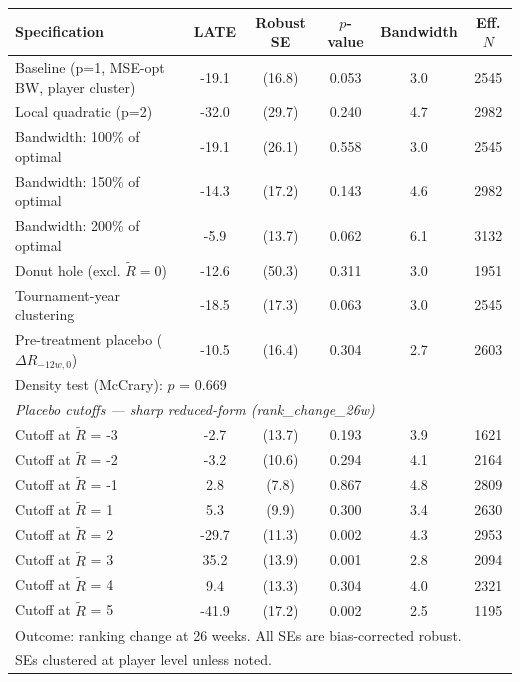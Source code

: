 \begin{tabular}{lccccc}
\toprule
Specification & LATE & Robust SE & $p$-value & Bandwidth & Eff. $N$ \\
\midrule
Baseline (p=1, MSE-opt BW, player cluster) & -19.1 & (16.8) & 0.053 & 3.0 & 2545 \\
Local quadratic (p=2) & -32.0 & (29.7) & 0.240 & 4.7 & 2982 \\
Bandwidth: 100\% of optimal & -19.1 & (26.1) & 0.558 & 3.0 & 2545 \\
Bandwidth: 150\% of optimal & -14.3 & (17.2) & 0.143 & 4.6 & 2982 \\
Bandwidth: 200\% of optimal & -5.9 & (13.7) & 0.062 & 6.1 & 3132 \\
Donut hole (excl. $\tilde{R} = 0$) & -12.6 & (50.3) & 0.311 & 3.0 & 1951 \\
Tournament-year clustering & -18.5 & (17.3) & 0.063 & 3.0 & 2545 \\
Pre-treatment placebo ($\Delta R_{-12w,0}$) & -10.5 & (16.4) & 0.304 & 2.7 & 2603 \\
\midrule
\multicolumn{6}{l}{\footnotesize Density test (McCrary): $p$ = 0.669} \\
\midrule
\multicolumn{6}{l}{\textit{Placebo cutoffs --- sharp reduced-form (rank\_change\_26w)}} \\
Cutoff at $\tilde{R}$ = -3 & -2.7 & (13.7) & 0.193 & 3.9 & 1621 \\
Cutoff at $\tilde{R}$ = -2 & -3.2 & (10.6) & 0.294 & 4.1 & 2164 \\
Cutoff at $\tilde{R}$ = -1 & 2.8 & (7.8) & 0.867 & 4.8 & 2809 \\
Cutoff at $\tilde{R}$ = 1 & 5.3 & (9.9) & 0.300 & 3.4 & 2630 \\
Cutoff at $\tilde{R}$ = 2 & -29.7 & (11.3) & 0.002 & 4.3 & 2953 \\
Cutoff at $\tilde{R}$ = 3 & 35.2 & (13.9) & 0.001 & 2.8 & 2094 \\
Cutoff at $\tilde{R}$ = 4 & 9.4 & (13.3) & 0.304 & 4.0 & 2321 \\
Cutoff at $\tilde{R}$ = 5 & -41.9 & (17.2) & 0.002 & 2.5 & 1195 \\
\midrule
\multicolumn{6}{l}{\footnotesize Outcome: ranking change at 26 weeks. All SEs are bias-corrected robust.} \\
\multicolumn{6}{l}{\footnotesize SEs clustered at player level unless noted.} \\
\bottomrule
\end{tabular}
